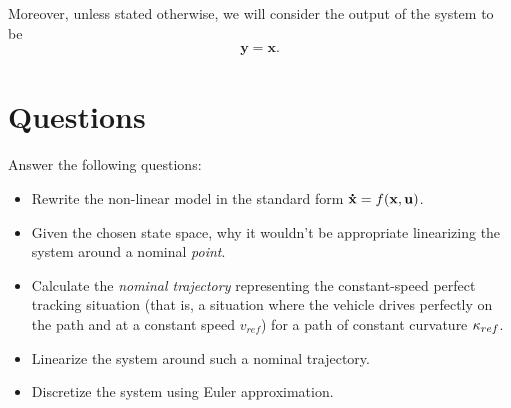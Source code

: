 		
	Moreover, unless stated otherwise, we will consider the output of the system to be 
	\begin{align}
		\mathbf{y} = \mathbf{x}.
	\end{align}
	\section{Questions}
	Answer the following questions:
	\begin{itemize}
		\item Rewrite the non-linear model in the standard form $\mathbf{\dot{x}} = f(\mathbf{x},\mathbf{u})$.
		\item Given the chosen state space, why it wouldn't be appropriate linearizing the system around a nominal \emph{point}.
		\item Calculate the \emph{nominal trajectory} representing the constant-speed perfect tracking situation (that is, a situation where the vehicle drives perfectly on the path and at a constant speed %
		$v_{ref}$) for a path of constant curvature $\kappa_{ref}$. 
		\item Linearize the system around such a nominal trajectory.
		\item Discretize the system using Euler approximation. 
	\end{itemize}

